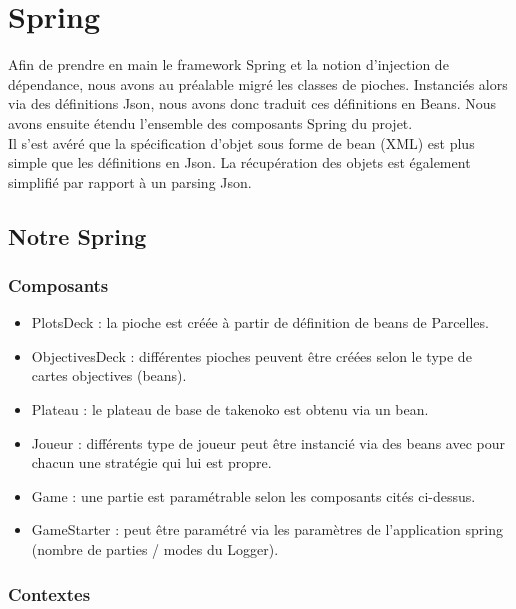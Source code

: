\chapter{Spring}
\label{spring}

Afin de prendre en main le framework Spring et la notion d'injection de dépendance, nous avons au préalable migré les classes de pioches. Instanciés alors via des définitions Json, nous avons donc traduit ces définitions en Beans. Nous avons ensuite étendu l'ensemble des composants Spring du projet.\\
Il s'est avéré que la spécification d'objet sous forme de bean (XML) est plus simple que les définitions en Json. La récupération des objets est également simplifié par rapport à un parsing Json.

\section{Notre Spring}

\subsection{Composants}

\begin{itemize}
   \item PlotsDeck : la pioche est créée à partir de définition de beans de Parcelles.\\ \item ObjectivesDeck : différentes pioches peuvent être créées selon le type de cartes objectives (beans).\\ \item Plateau : le plateau de base de takenoko est obtenu via un bean.\\ \item Joueur : différents type de joueur peut être instancié via des beans avec pour chacun une stratégie qui lui est propre.\\ \item Game : une partie est paramétrable selon les composants cités ci-dessus.\\ \item GameStarter : peut être paramétré via les paramètres de l'application spring (nombre de parties / modes du Logger).
\end{itemize}

\subsection{Contextes}

